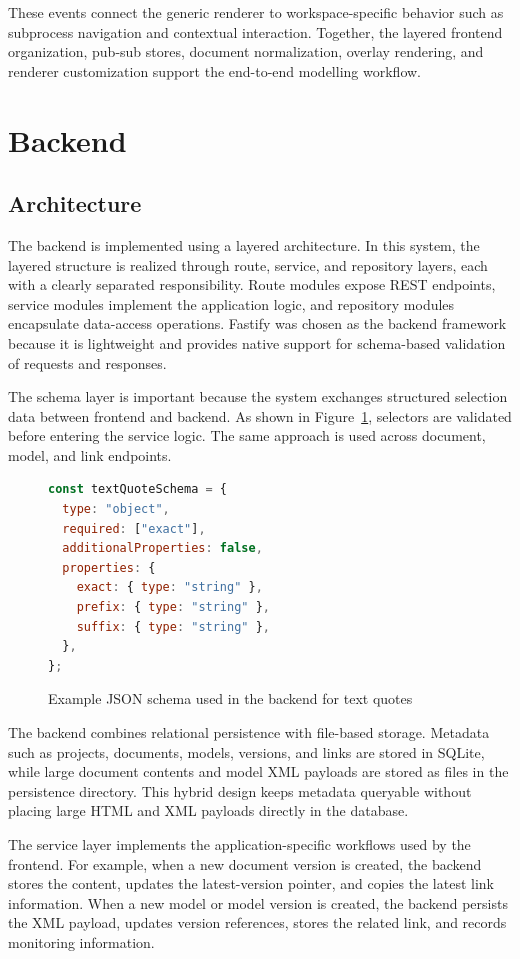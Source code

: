 These events connect the generic renderer to workspace-specific behavior such as subprocess navigation and contextual interaction. Together, the layered frontend organization, pub-sub stores, document normalization, overlay rendering, and renderer customization support the end-to-end modelling workflow.
\section{Backend}
\subsection{Architecture}
The backend is implemented using a layered architecture. In this system, the layered structure is realized through route, service, and repository layers, each with a clearly separated responsibility. Route modules expose REST endpoints, service modules implement the application logic, and repository modules encapsulate data-access operations. Fastify was chosen as the backend framework because it is lightweight and provides native support for schema-based validation of requests and responses.

The schema layer is important because the system exchanges structured selection data between frontend and backend. As shown in Figure~\ref{fig:imp_backend_schema_example}, selectors are validated before entering the service logic. The same approach is used across document, model, and link endpoints.

\begin{figure}[H]
  \centering
  \caption{Example JSON schema used in the backend for text quotes}
  \label{fig:imp_backend_schema_example}
  \begin{lstlisting}[language=JavaScript]
const textQuoteSchema = {
  type: "object",
  required: ["exact"],
  additionalProperties: false,
  properties: {
    exact: { type: "string" },
    prefix: { type: "string" },
    suffix: { type: "string" },
  },
};
  \end{lstlisting}
\end{figure}

The backend combines relational persistence with file-based storage. Metadata such as projects, documents, models, versions, and links are stored in SQLite, while large document contents and model XML payloads are stored as files in the persistence directory. This hybrid design keeps metadata queryable without placing large HTML and XML payloads directly in the database.

The service layer implements the application-specific workflows used by the frontend. For example, when a new document version is created, the backend stores the content, updates the latest-version pointer, and copies the latest link information. When a new model or model version is created, the backend persists the XML payload, updates version references, stores the related link, and records monitoring information.

